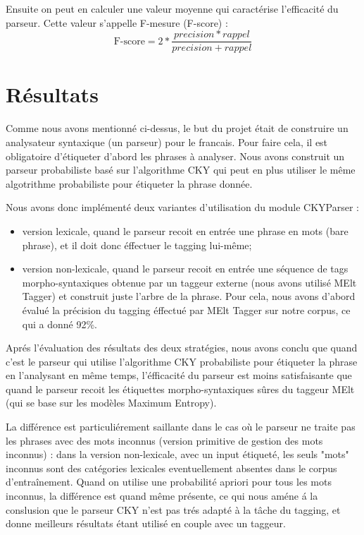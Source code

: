 \documentclass[12pt]{article}
\begin{document}
Ensuite on peut en calculer une valeur moyenne qui caract\'erise l'efficacit\'e
du parseur. Cette valeur s'appelle F-mesure (F-score) :
$$
\text{F-score} = 2*\frac{precision * rappel}{precision + rappel}
$$

\section{R\'esultats}
Comme nous avons mentionn\'e ci-dessus, le but du projet \'etait de construire
un analysateur syntaxique (un parseur) pour le francais. Pour faire cela, il est
obligatoire d'\'etiqueter d'abord les phrases \`a analyser. Nous avons construit
un parseur probabiliste bas\'e sur l'algorithme CKY qui peut en plus utiliser le
m\^eme algotrithme probabiliste pour \'etiqueter la phrase donn\'ee. \par
Nous avons donc impl\'ement\'e deux variantes d'utilisation du module CKYParser
:
\begin{itemize}
  \item version lexicale, quand le parseur recoit en entr\'ee une phrase en mots
  (bare phrase), et il doit donc \'effectuer le tagging lui-même;
  \item version non-lexicale, quand le parseur recoit en entr\'ee une s\'equence
  de tags morpho-syntaxiques obtenue par un taggeur externe (nous avons
  utilis\'e MElt Tagger) et construit juste l'arbre de la phrase. Pour cela,
  nous avons d'abord \'evalu\'e la pr\'ecision du tagging \'effectu\'e par MElt
  Tagger sur notre corpus, ce qui a donn\'e 92\%.
\end{itemize}

Apr\'es l'\'evaluation des r\'esultats des deux strat\'egies, nous avons conclu
que quand c'est le parseur qui utilise l'algorithme CKY
probabiliste pour \'etiqueter la phrase en l'analysant en m\^eme temps, 
l'\'efficacit\'e du parseur est moins satisfaisante que quand le parseur recoit
les \'etiquettes morpho-syntaxiques s\^ures du taggeur MElt (qui se base sur
les mod\`eles Maximum Entropy). \par
La diff\'erence est particuli\'erement
saillante dans le cas o\`u le parseur ne traite pas les phrases avec des mots inconnus
(version primitive de gestion des mots inconnus) : dans la version
non-lexicale, avec un input \'etiquet\'e, les seuls "mots" inconnus sont des
cat\'egories lexicales eventuellement absentes dans le corpus d'entra\^inement.
Quand on utilise une probabilit\'e apriori pour tous les mots inconnus, la
diff\'erence est quand m\^eme pr\'esente, ce qui nous am\'ene \'a la conslusion
que le parseur CKY n'est pas tr\'es adapt\'e \`a la t\^ache du tagging, et donne
meilleurs r\'esultats \'etant utilis\'e en couple avec un taggeur.\par
\end{document}
